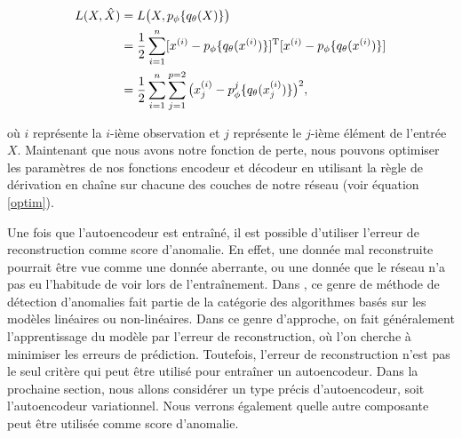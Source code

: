 \begin{equation*} \label{perte1}
\DIFdelbegin %
\DIFdelend \DIFaddbegin \begin{split}
L(X,\hat{X}) & = L\big(X, p_\phi\{q_\theta(X)\}\big) \\
& = \frac{1}{2} \sum_{i=1}^{n} [x^{(i)}-p_\phi\{q_\theta(x^{(i)})\}]^{\text{T}}[x^{(i)}-p_\phi\{q_\theta(x^{(i)})\}] \\
& = \frac{1}{2} \sum_{i=1}^{n} \sum_{j=1}^{p=2} \big(x_{j}^{(i)}-p^j_\phi\{q_\theta(x_{j}^{(i)})\}\big)^2,
\end{split}\DIFaddend 
\end{equation*}

où $i$ représente la $i$-ième observation et $j$ représente le $j$-ième élément de l'entrée $X$. Maintenant que nous avons notre fonction de perte, nous pouvons optimiser les paramètres de nos fonctions encodeur et décodeur en utilisant la règle de dérivation en chaîne sur chacune des couches de notre réseau (voir équation \ref{optim}). \DIFaddbegin {}\DIFaddend 

Une fois que l'autoencodeur est entraîné, il est possible d'utiliser l'erreur de reconstruction comme score d'anomalie. En effet, une donnée mal reconstruite pourrait être vue comme une donnée aberrante, ou une donnée que le réseau n'a pas eu l'habitude de voir lors de l'entraînement. Dans  \cite{10.5555/3086742}, ce genre de méthode de détection d'anomalies fait partie de la catégorie des algorithmes basés sur les modèles linéaires ou non-linéaires. Dans ce genre d'approche, on fait généralement l'apprentissage du modèle par l'erreur de reconstruction, où l'on cherche à minimiser les erreurs de prédiction. Toutefois, l'erreur de reconstruction n'est pas le seul critère qui peut être utilisé pour entraîner un autoencodeur. Dans la prochaine section, nous allons considérer un type précis d'autoencodeur, soit l'autoencodeur variationnel. Nous verrons également quelle autre composante peut être utilisée comme score d'anomalie.

